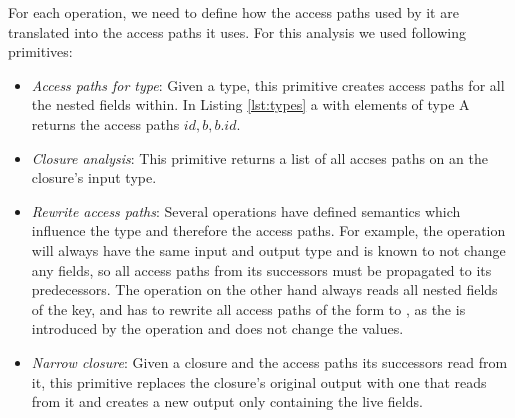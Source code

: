 For each operation, we need to define how the access paths used by it are translated into the access paths it uses. For this analysis we used following primitives:
\begin{itemize}
\item \emph{Access paths for type}: Given a type, this primitive creates access paths for all the nested fields within. In Listing \ref{lst:types} a  with elements of type A returns the access paths ${id, b, b.id}$. 
\item \emph{Closure analysis}: This primitive returns a list of all accses paths on an the closure's input type.
\item \emph{Rewrite access paths}: Several operations have defined semantics which influence the type and therefore the access paths. For example, the  operation will always have the same input and output type and is known to not change any fields, so all access paths from its successors must be propagated to its predecessors. The  operation on the other hand always reads all nested fields of the key, and has to rewrite all access paths of the form  to , as the  is introduced by the  operation and does not change the values.
\item \emph{Narrow closure}: Given a closure and the access paths its successors read from it, this primitive replaces the closure's original output with one that reads from it and creates a new output only containing the live fields.
\end{itemize}

